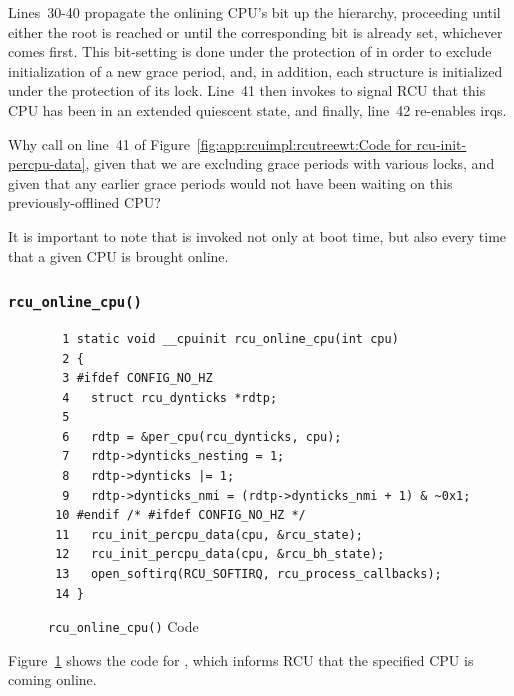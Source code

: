 Lines~30-40 propagate the onlining CPU's bit up the 
hierarchy, proceeding until either the root  is
reached or until the corresponding bit is already set, whichever
comes first.
This bit-setting is done under the protection of 
in order to exclude initialization of a new grace period, and, in addition,
each  structure is initialized under the protection
of its lock.
Line~41 then invokes  to signal RCU that this
CPU has been in an extended quiescent state, and finally, line~42
re-enables irqs.

\QuickQuiz{}
	Why call  on line~41 of
	Figure~\ref{fig:app:rcuimpl:rcutreewt:Code for rcu-init-percpu-data},
	given that we are excluding grace periods with various
	locks, and given that any earlier grace periods would not have
	been waiting on this previously-offlined CPU?
 \QuickQuizEnd

It is important to note that  is invoked
not only at boot time, but also every time that a given CPU is brought
online.

\subsubsection{\tt rcu\_online\_cpu()}
\label{app:rcuimpl:rcutreewt:rcu-online-cpu}

\begin{figure}[tbp]
{ \scriptsize
\begin{verbatim}
  1 static void __cpuinit rcu_online_cpu(int cpu)
  2 {
  3 #ifdef CONFIG_NO_HZ
  4   struct rcu_dynticks *rdtp;
  5
  6   rdtp = &per_cpu(rcu_dynticks, cpu);
  7   rdtp->dynticks_nesting = 1;
  8   rdtp->dynticks |= 1;
  9   rdtp->dynticks_nmi = (rdtp->dynticks_nmi + 1) & ~0x1;
 10 #endif /* #ifdef CONFIG_NO_HZ */
 11   rcu_init_percpu_data(cpu, &rcu_state);
 12   rcu_init_percpu_data(cpu, &rcu_bh_state);
 13   open_softirq(RCU_SOFTIRQ, rcu_process_callbacks);
 14 }
\end{verbatim}
}
\caption{{\tt rcu\_online\_cpu()} Code}
\label{fig:app:rcuimpl:rcutreewt:Code for rcu-online-cpu}
\end{figure}

Figure~\ref{fig:app:rcuimpl:rcutreewt:Code for rcu-online-cpu}
shows the code for , which informs RCU that the
specified CPU is coming online.

